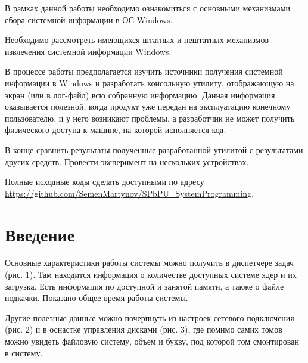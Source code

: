 \documentclass[a4paper, 12pt]{report}		%
\begin{document}
\vspace{1em}

В рамках данной работы необходимо ознакомиться с основными механизмами сбора системной информации в ОС Windows.
\vspace{1em}

Необходимо рассмотреть имеющихся штатных и нештатных механизмов извлечения системной информации Windows. 
\vspace{1em}

В процессе работы предполагается изучить источники получения системной информации в Windows и разработать консольную утилиту, отображающую на экран (или в лог-файл) всю собранную информацию. Данная информация оказывается полезной, когда продукт уже передан на эксплуатацию конечному пользователю, и у него возникают проблемы, а разработчик не может получить физического доступа к машине, на которой исполняется код.
\vspace{1em}

В конце сравнить результаты полученные разработанной утилитой с результатами других средств. Провести эксперимент на нескольких устройствах.
\vspace{1em}

Полные исходные коды сделать доступными по адресу \url{https://github.com/SemenMartynov/SPbPU_SystemProgramming}.


\chapter*{Введение}

Основные характеристики работы системы можно получить в диспетчере задач (рис. 1). Там находится информация о количестве доступных системе ядер и их загрузка. Есть информация по доступной и занятой памяти, а также о файле подкачки. Показано общее время работы системы.

Другие полезные данные можно почерпнуть из настроек сетевого подключения (рис. 2) и в оснастке управления дисками (рис. 3), где помимо самих томов можно увидеть файловую систему, объём и букву, под которой том смонтирован в систему.
\end{document}
